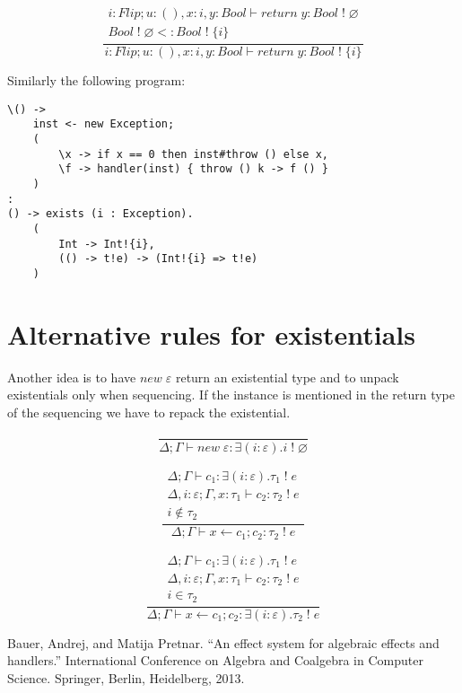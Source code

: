 \documentclass[12pt]{article}
\newcommand\eff[0]{\varepsilon}
\newcommand\ty[0]{\tau}
\newcommand\tunit[0]{()}
\newcommand\aty[2]{#1 \; ! \; #2}
\newcommand\texists[3]{\exists(#1:#2) . #3}
\newcommand\comp[0]{c}
\newcommand\creturn[1]{\textit{return} \; #1}
\newcommand\cdo[3]{#1 \leftarrow #2 ; #3}
\newcommand\cnew[1]{\textit{new} \; #1}
\newcommand\subty[2]{#1 <: #2}
\begin{document}
\[\frac{
\begin{array}{l}
i:Flip;u:\tunit,x:i,y:Bool \vdash \creturn{y} : \aty{Bool}{\varnothing} \\
\subty{\aty{Bool}{\varnothing}}{\aty{Bool}{\{i\}}}
\end{array}
}{
i:Flip;u:\tunit,x:i,y:Bool \vdash \creturn{y} : \aty{Bool}{\{i\}}
}\]

Similarly the following program:
\begin{verbatim}
\() ->
	inst <- new Exception;
	(
		\x -> if x == 0 then inst#throw () else x,
		\f -> handler(inst) { throw () k -> f () }
	)
:
() -> exists (i : Exception).
	(
		Int -> Int!{i},
		(() -> t!e) -> (Int!{i} => t!e)
	)
\end{verbatim}

\section{Alternative rules for existentials}

Another idea is to have $\cnew{\eff}$ return an existential type and to unpack existentials only when sequencing.
If the instance is mentioned in the return type of the sequencing we have to repack the existential.

\[\frac{
}{
	\Delta;\Gamma \vdash \cnew{\eff} : \texists{i}{\eff}{\aty{i}{\varnothing}}
}\]

\begin{minipage}{0.5\textwidth}
\[\frac{
	\begin{array}{l}
	\Delta;\Gamma \vdash \comp_1 : \texists{i}{\eff}{\aty{\ty_1}{e}} \\
	\Delta,i:\eff;\Gamma,x:\ty_1 \vdash \comp_2 : \aty{\ty_2}{e} \\
	i \notin \ty_2
	\end{array}
}{
	\Delta;\Gamma \vdash \cdo{x}{\comp_1}{\comp_2} : \aty{\ty_2}{e}
}\]
\end{minipage}
\begin{minipage}{0.5\textwidth}
\[\frac{
	\begin{array}{l}
	\Delta;\Gamma \vdash \comp_1 : \texists{i}{\eff}{\aty{\ty_1}{e}} \\
	\Delta,i:\eff;\Gamma,x:\ty_1 \vdash \comp_2 : \aty{\ty_2}{e} \\
	i \in \ty_2
	\end{array}
}{
	\Delta;\Gamma \vdash \cdo{x}{\comp_1}{\comp_2} : \texists{i}{\eff}{\aty{\ty_2}{e}}
}\]
\end{minipage}

\begin{thebibliography}{9}
Bauer, Andrej, and Matija Pretnar. ``An effect system for algebraic effects and handlers.'' International Conference on Algebra and Coalgebra in Computer Science. Springer, Berlin, Heidelberg, 2013.
\end{thebibliography}
\end{document}
